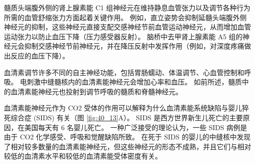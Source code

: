 髓质头端腹外侧的肾上腺素能 C1 组神经元在维持静息血管张力以及调节各种行为所需的血管舒缩张力方面起着关键作用。
例如，直立姿势会抑制延髓头端腹外侧神经元的抑制，这些神经元直接支配交感神经节前血管运动神经元，从而增加血管运动张力以防止血压下降（压力感受器反射）。
脑桥中去甲肾上腺素能 A5 组的神经元会抑制交感神经节前神经元，并在降压反射中发挥作用（例如，对深度疼痛做出反应的血压下降）。


血清素调节许多不同的自主神经功能，包括胃肠蠕动、体温调节、心血管控制和呼吸。
电刺激中缝髓核内的血清素能神经元会增加心率和血压。
如前所述，髓质中的血清素能神经元也投射到调节呼吸的髓质和脊髓神经元。


血清素能神经元作为 CO2 受体的作用可以解释为什么血清素能系统缺陷与婴儿猝死综合症 (SIDS) 有关（图 \ref{fig:40_13}A）。
SIDS 是西方世界新生儿死亡的主要原因，在美国每天有 6 名婴儿死亡。
一种广泛接受的理论认为，一些 SIDS 病例是由于 CO2 化学感受、呼吸和觉醒缺陷所致。
在死于 SIDS 的婴儿的中缝核中发现了相对较多数量的血清素能神经元，但这些神经元的形态不成熟，并且它们与相对较低的血清素水平和较低的血清素能受体密度有关。


